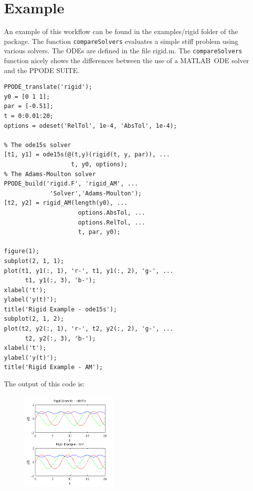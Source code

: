 \documentclass[a4paper,10pt,twocolumn]{article}
\newcommand{\PPODESUITE}{PPODE SUITE}
\newcommand{\MATLAB}{MATLAB}
\newcommand{\matlabcmdinline}[1]{\textacutedbl\texttt{\footnotesize#1}\textgravedbl}
\newcommand{\filepath}[1]{{\footnotesize\textacutedbl #1\textacutedbl}}
\begin{document}
\section{Example}
An example of this workflow can be found in the \filepath{examples/rigid} folder of the package. The function \matlabcmdinline{compareSolvers} evaluates a simple stiff problem using various solvers. The ODEs are defined in the file \filepath{rigid.m}. The \matlabcmdinline{compareSolvers} function nicely shows the differences between the use of a \MATLAB~ODE solver and the \PPODESUITE.
\vspace{1cm}
  \begin{lstlisting}[style=matlabcode,caption=Code Snippet]
PPODE_translate('rigid');
y0 = [0 1 1];
par = [-0.51];
t = 0:0.01:20;
options = odeset('RelTol', 1e-4, 'AbsTol', 1e-4);

% The ode15s solver
[t1, y1] = ode15s(@(t,y)(rigid(t, y, par)), ...
                   t, y0, options);
% The Adams-Moulton solver
PPODE_build('rigid.F', 'rigid_AM', ...
             'Solver','Adams-Moulton');
[t2, y2] = rigid_AM(length(y0), ...
                     options.AbsTol, ... 
                     options.RelTol, ...
                     t, par, y0);
                     
figure(1);
subplot(2, 1, 1);
plot(t1, y1(:, 1), 'r-', t1, y1(:, 2), 'g-', ...
      t1, y1(:, 3), 'b-');
xlabel('t');
ylabel('y(t)');
title('Rigid Example - ode15s');
subplot(2, 1, 2);
plot(t2, y2(:, 1), 'r-', t2, y2(:, 2), 'g-', ...
      t2, y2(:, 3), 'b-');
xlabel('t');
ylabel('y(t)');
title('Rigid Example - AM');
\end{lstlisting}
The output of this code is:
\begin{figure}[hb!]
 \centering
 \includegraphics[width=0.43\textwidth]{./RigidSolution.png}
\end{figure}
\end{document}
